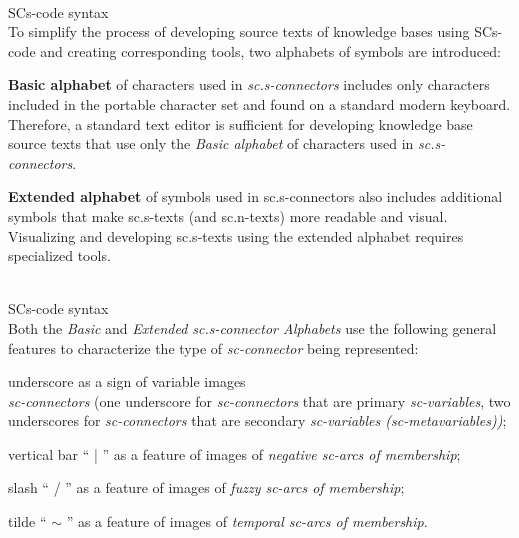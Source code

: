 \begin{frame}{\\SCs-code syntax}
	\topline
	\justifying
	\vspace*{\fill}\\
	\vspace{10mm}
	To simplify the process of developing source texts of knowledge bases using SCs-code and creating corresponding tools, two alphabets of symbols are introduced:
	\begin{textitemize}
		\item \textbf{Basic alphabet} of characters used in \textit{sc.s-connectors} includes only characters included in the portable character set and found on a standard modern keyboard. Therefore, a standard text editor is sufficient for developing knowledge base source texts that use only the \textit{Basic alphabet} of characters used in \textit{sc.s-connectors}.
		\item  \textbf{Extended alphabet} of symbols used in sc.s-connectors also includes additional symbols that make sc.s-texts (and sc.n-texts) more readable and visual. Visualizing and developing sc.s-texts using the extended alphabet requires specialized tools.
	\end{textitemize}
\end{frame}

\begin{frame}{\\SCs-code syntax}
	\topline
	\justifying
	\vspace*{\fill}\\
	\vspace{10mm}
	Both the \textit{Basic} and \textit{Extended sc.s-connector Alphabets} use the following general features to characterize the type of \textit{sc-connector} being represented:
	\begin{textitemize}
		\item underscore as a sign of variable images \\ \textit{sc-connectors} (one underscore for \textit{sc-connectors} that are primary \textit{sc-variables}, two underscores for \textit{sc-connectors} that are secondary \textit{sc-variables (sc-metavariables))};
		\item vertical bar “ | ” as a feature of images of \textit{negative sc-arcs of membership};
		\item slash “ / ” as a feature of images of \textit{fuzzy sc-arcs of membership};
		\item tilde “ $\sim$ ” as a feature of images of \textit{temporal sc-arcs of membership}.
	\end{textitemize}
\end{frame}

